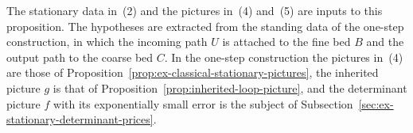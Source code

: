The stationary data in~(2) and the pictures in~(4) and~(5) are inputs
to this proposition. The hypotheses are extracted from the standing data of the one-step
construction, in which the incoming path $U$ is attached to the fine
bed $B$ and the output path to the coarse bed $C$. In the one-step
construction the pictures
in~(4) are those of Proposition~\ref{prop:ex-classical-stationary-pictures},
the inherited picture $g$ is that of
Proposition~\ref{prop:inherited-loop-picture}, and the determinant
picture $f$ with its exponentially small error is the subject of
Subsection~\ref{sec:ex-stationary-determinant-prices}.
